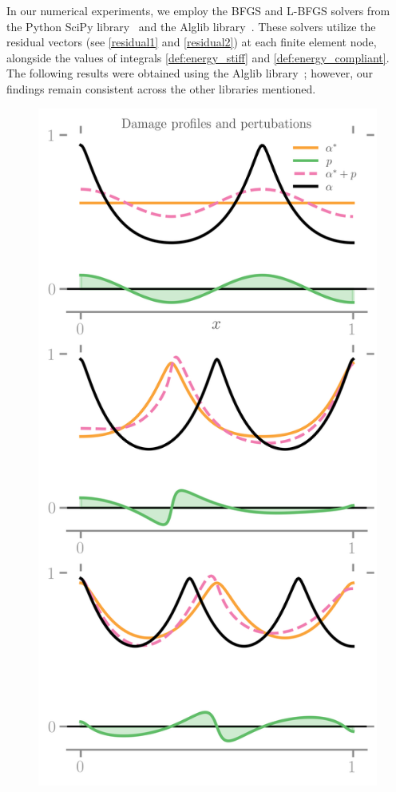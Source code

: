 In our numerical experiments, we employ the BFGS and L-BFGS solvers from the Python SciPy library~\cite{2020SciPy-NMeth} and the Alglib library~\cite{Bochkanov2013-lk}. These solvers utilize the residual vectors (see \ref{residual1} and \ref{residual2}) at each finite element node, alongside the values of integrals \eqref{def:energy_stiff} and \eqref{def:energy_compliant}.
The following results were obtained using the Alglib library~\cite{Bochkanov2013-lk}; however, our findings remain consistent across the other libraries mentioned.



\begin{figure}[htbp]
    \centering
    \includegraphics*[align=c,width=.45\textwidth]{../images/model_stiff_kick_profiles.png}

\end{figure}
